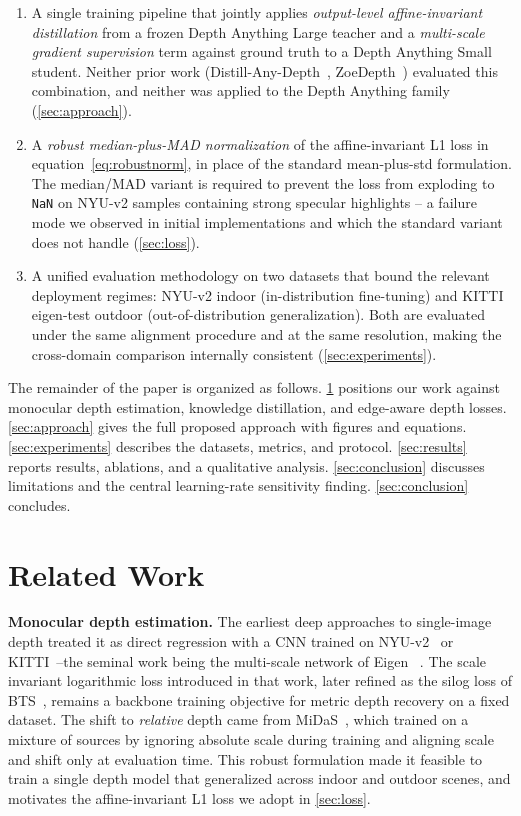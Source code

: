 \documentclass[10pt,twocolumn,letterpaper]{article}
\begin{document}
\begin{enumerate}
    \item A single training pipeline that jointly applies
    \emph{output-level affine-invariant distillation} from a frozen
    Depth Anything Large teacher and a \emph{multi-scale gradient
    supervision} term against ground truth to a Depth Anything Small
    student. Neither prior work (Distill-Any-Depth~\cite{he2025distillanydepth},
    ZoeDepth~\cite{bhat2023zoedepth}) evaluated this combination, and
    neither was applied to the Depth Anything family
    (\cref{sec:approach}).
    \item A \emph{robust median-plus-MAD normalization} of the
    affine-invariant L1 loss in equation~\eqref{eq:robustnorm}, in
    place of the standard mean-plus-std formulation. The median/MAD
    variant is required to prevent the loss from exploding to
    \texttt{NaN} on NYU-v2 samples containing strong specular
    highlights -- a failure mode we observed in initial implementations
    and which the standard variant does not handle
    (\cref{sec:loss}).
    \item A unified evaluation methodology on two datasets that bound
    the relevant deployment regimes: NYU-v2 indoor (in-distribution
    fine-tuning) and KITTI eigen-test outdoor
    (out-of-distribution generalization). Both are evaluated under the
    same alignment procedure and at the same resolution, making the
    cross-domain comparison internally consistent
    (\cref{sec:experiments}).
\end{enumerate}

The remainder of the paper is organized as follows. \cref{sec:related}
positions our work against monocular depth estimation, knowledge
distillation, and edge-aware depth losses. \cref{sec:approach} gives the
full proposed approach with figures and equations. \cref{sec:experiments}
describes the datasets, metrics, and protocol. \cref{sec:results} reports
results, ablations, and a qualitative analysis. \cref{sec:conclusion}
discusses limitations and the central learning-rate sensitivity finding.
\cref{sec:conclusion} concludes.

\section{Related Work}
\label{sec:related}

\textbf{Monocular depth estimation.} The earliest deep approaches to
single-image depth treated it as direct regression with a CNN trained on
NYU-v2~\cite{silberman2012nyuv2} or KITTI~\cite{geiger2013kitti}--the
seminal work being the multi-scale network of
Eigen \etal~\cite{eigen2014depth}. The scale invariant logarithmic loss
introduced in that work, later refined as the silog loss of
BTS~\cite{lee2019bts}, remains a backbone training objective for metric
depth recovery on a fixed dataset. The shift to \emph{relative} depth
came from MiDaS~\cite{ranftl2022midas}, which trained on a mixture of
sources by ignoring absolute scale during training and aligning scale
and shift only at evaluation time. This robust formulation made it
feasible to train a single depth model that generalized across indoor
and outdoor scenes, and motivates the affine-invariant L1 loss we adopt
in \cref{sec:loss}.
\end{document}
